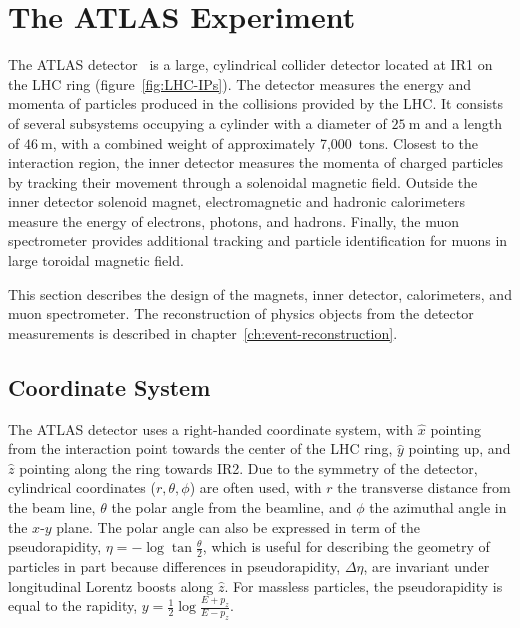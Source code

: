 \section{The ATLAS Experiment}\label{sec:the-atlas-experiment}

The ATLAS detector~\cite{TheATLASCollaboration:2008fg} is a large, cylindrical collider detector located at IR1 on the LHC ring (figure~\ref{fig:LHC-IPs}). The detector measures the energy and momenta of particles produced in the collisions provided by the LHC. It consists of several subsystems occupying a cylinder with a diameter of $\SI{25}{\meter}$ and a length of $\SI{46}{\meter}$, with a combined weight of approximately 7,000~tons. Closest to the interaction region, the inner detector measures the momenta of charged particles by tracking their movement through a solenoidal magnetic field. Outside the inner detector solenoid magnet, electromagnetic and hadronic calorimeters measure the energy of electrons, photons, and hadrons. Finally, the muon spectrometer provides additional tracking and particle identification for muons in large toroidal magnetic field. 

This section describes the design of the magnets, inner detector, calorimeters, and muon spectrometer. The reconstruction of physics objects from the detector measurements is described in chapter~\ref{ch:event-reconstruction}. 

\subsection{Coordinate System}\label{sec:ATLAS-coordinate-system}

The ATLAS detector uses a right-handed coordinate system, with $\hat{x}$ pointing from the interaction point towards the center of the LHC ring, $\hat{y}$ pointing up, and $\hat{z}$ pointing along the ring towards IR2. Due to the symmetry of the detector, cylindrical coordinates ($r,\theta,\phi$) are often used, with $r$ the transverse distance from the beam line, $\theta$ the polar angle from the beamline, and $\phi$ the azimuthal angle in the $x$-$y$ plane. The polar angle can also be expressed in term of the pseudorapidity, $\eta = -\log \tan \frac{\theta}{2}$, which is useful for describing the geometry of particles in part because differences in pseudorapidity, $\Delta\eta$, are invariant under longitudinal Lorentz boosts along $\hat{z}$. For massless particles, the pseudorapidity is equal to the rapidity, $y=\frac12 \log \frac{E+p_z}{E-p_z}$. 


